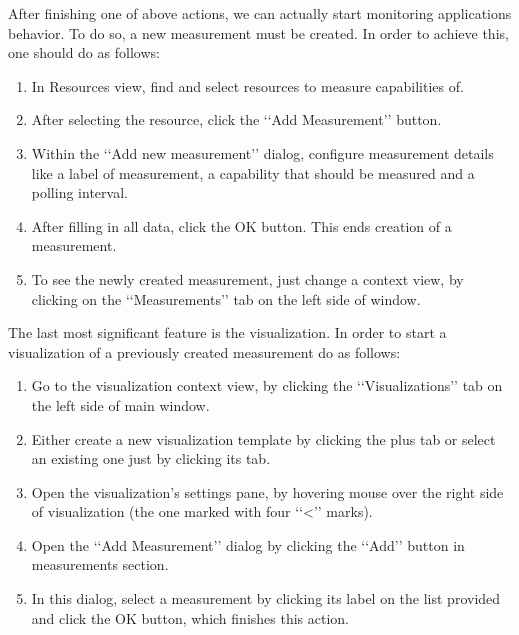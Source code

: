 After finishing one of above actions, we can actually start monitoring applications behavior. To do so, a new measurement must be created. In order to achieve this, one should do as follows:

\begin{enumerate}

\item In Resources view, find and select resources to measure capabilities of.

\item After selecting the resource, click the \lq\lq{}Add Measurement\rq\rq{} button.

\item Within the \lq\lq{}Add new measurement\rq\rq{} dialog, configure measurement details like a label of measurement, a capability that should be measured and a polling interval.

\item After filling in all data, click the OK button. This ends creation of a measurement. 

\item To see the newly created measurement, just change a context view, by clicking on the \lq\lq{}Measurements\rq\rq{} tab on the left side of window.

\end{enumerate}

The last most significant feature is the visualization. In order to start a visualization of a previously created measurement do as follows:

\begin{enumerate}

\item Go to the visualization context view, by clicking the \lq\lq{}Visualizations\rq\rq{} tab on the left side of main window.

\item Either create a new visualization template by clicking the plus tab or select an existing one just by clicking its tab.

\item Open the visualization\rq{}s settings pane, by hovering mouse over the right side of visualization (the one marked with four \lq\lq{}<\rq\rq{} marks).

\item Open the \lq\lq{}Add Measurement\rq\rq{} dialog by clicking the \lq\lq{}Add\rq\rq{} button in measurements section.

\item In this dialog, select a measurement by clicking its label on the list provided and click the OK button, which finishes this action.

\end{enumerate}
